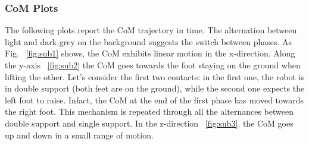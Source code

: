 \documentclass[main.tex]{subfiles}
\begin{document}
\subsubsection*{CoM Plots}
The following plots report the CoM trajectory in time. 
The alternation between light and dark grey on the background suggests the switch between phases.
As Fig. ~\ref{fig:sub1} shows, the CoM exhibits linear motion in the x-direction.
Along the y-axis ~\ref{fig:sub2} the CoM goes towards the foot staying on the ground when lifting the other. Let's consider the first two contacts: in the first one, the robot is in double support (both feet are on the ground), while the second one expects the left foot to raise. Infact, the CoM at the end of the first phase has moved towards the right foot. This mechanism is repeated through all the alternances between double support and single support.
In the z-direction ~\ref{fig:sub3}, the CoM goes up and down in a small range of motion.
\end{document}
